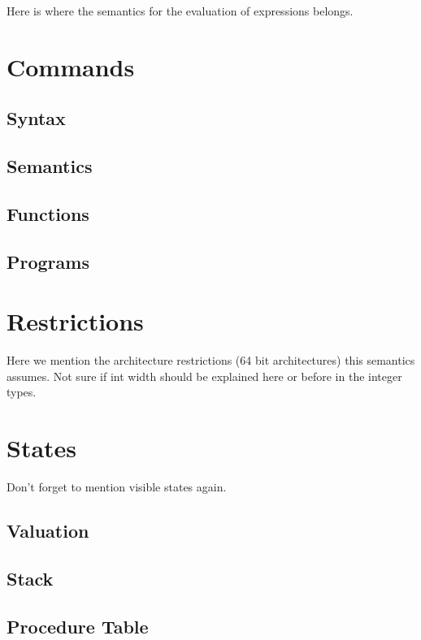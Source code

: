Here is where the semantics for the evaluation of expressions belongs.

\section{Commands}\label{section:commands}

\subsection{Syntax}\label{subsection:syntax_commands}

\subsection{Semantics}\label{subsection:semantics_commands}

\subsection{Functions}\label{subsection:functions_commands}
\subsection{Programs}\label{subsection:programs_commands}

\section{Restrictions}\label{subsection:restrictions_commands}

Here we mention the architecture restrictions (64 bit architectures) this semantics assumes.
Not sure if int width should be explained here or before in the integer types.

\section{States}\label{section:states}

Don't forget to mention visible states again.

\subsection{Valuation}\label{subsection:valuation}
\subsection{Stack}\label{subsection:stack}
\subsection{Procedure Table}\label{subsection:procedure_table}

